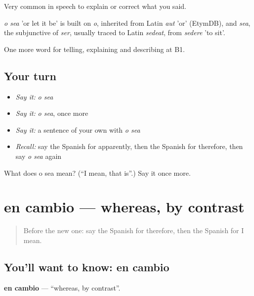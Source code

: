 Very common in speech to explain or correct what you said.

\begin{cousinweb}
\emph{o sea} 'or let it be' is built on \emph{o}, inherited from Latin \emph{aut} 'or' (EtymDB), and \emph{sea}, the subjunctive of \emph{ser}, usually traced to Latin \emph{sedeat}, from \emph{sedere} 'to sit'.
\end{cousinweb}

\begin{grammarlens}[title={What you've built}]
One more word for telling, explaining and describing at B1.
\end{grammarlens}

\subsection*{Your turn}
\begin{itemize}
\raggedright
  \item \emph{Say it:} \emph{o sea}
  \item \emph{Say it:} \emph{o sea}, once more
  \item \emph{Say it:} a sentence of your own with \emph{o sea}
  \item \emph{Recall:} say the Spanish for apparently, then the Spanish for therefore, then say \emph{o sea} again
\end{itemize}

\begin{tcolorbox}[breakable,colback=teal!4,colframe=teal!35!black,title={Before you move on}]
What does o sea mean? (\textquotedblleft{}I mean, that is\textquotedblright{}.) Say it once more.
\end{tcolorbox}
\section[en cambio]{en cambio — whereas, by contrast}

\label{lesson:ES-C588-en-cambio}



\begin{quote}
Before the new one: say the Spanish for therefore, then the Spanish for I mean.
\end{quote}

\subsection*{You'll want to know: en cambio}
\textbf{en cambio} — \textquotedblleft{}whereas, by contrast\textquotedblright{}.

